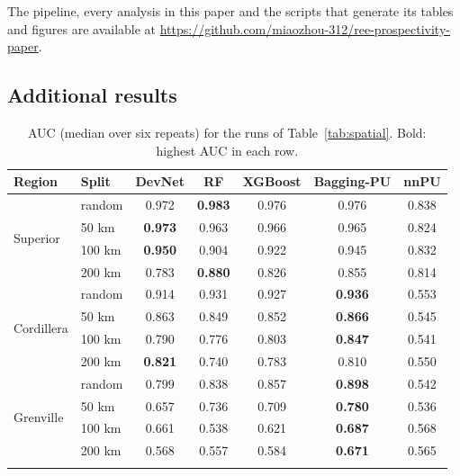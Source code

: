 \documentclass[pdflatex,sn-apa]{sn-jnl}
\begin{document}
The pipeline, every analysis in this paper and the scripts that generate its tables and figures are available at \url{https://github.com/miaozhou-312/ree-prospectivity-paper}.

\begin{appendices}

\section{Additional results}\label{app:full}

\begin{table}[!h]
\caption{AUC (median over six repeats) for the runs of Table~\ref{tab:spatial}. Bold: highest AUC in each row.}\label{tab:spatial-auc}
\footnotesize
\setlength{\tabcolsep}{3pt}
\begin{tabular*}{\textwidth}{@{\extracolsep\fill}llccccc}
\toprule
Region & Split & DevNet & RF & XGBoost & Bagging-PU & nnPU \\
\midrule
\multirow{4}{*}{Superior} & random & 0.972 & \textbf{0.983} & 0.976 & 0.976 & 0.838 \\
 & 50 km & \textbf{0.973} & 0.963 & 0.966 & 0.965 & 0.824 \\
 & 100 km & \textbf{0.950} & 0.904 & 0.922 & 0.945 & 0.832 \\
 & 200 km & 0.783 & \textbf{0.880} & 0.826 & 0.855 & 0.814 \\
\midrule
\multirow{4}{*}{Cordillera} & random & 0.914 & 0.931 & 0.927 & \textbf{0.936} & 0.553 \\
 & 50 km & 0.863 & 0.849 & 0.852 & \textbf{0.866} & 0.545 \\
 & 100 km & 0.790 & 0.776 & 0.803 & \textbf{0.847} & 0.541 \\
 & 200 km & \textbf{0.821} & 0.740 & 0.783 & 0.810 & 0.550 \\
\midrule
\multirow{4}{*}{Grenville} & random & 0.799 & 0.838 & 0.857 & \textbf{0.898} & 0.542 \\
 & 50 km & 0.657 & 0.736 & 0.709 & \textbf{0.780} & 0.536 \\
 & 100 km & 0.661 & 0.538 & 0.621 & \textbf{0.687} & 0.568 \\
 & 200 km & 0.568 & 0.557 & 0.584 & \textbf{0.671} & 0.565 \\
\botrule
\end{tabular*}
\end{table}


\end{appendices}
\end{document}
